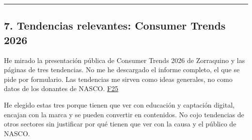 \documentclass[
]{article}
\begin{document}
\begin{center}\rule{0.5\linewidth}{0.5pt}\end{center}

\hypertarget{tendencias-relevantes-consumer-trends-2026}{%
\subsection{7. Tendencias relevantes: Consumer Trends
2026}\label{tendencias-relevantes-consumer-trends-2026}}

He mirado la presentación pública de Consumer Trends 2026 de Zorraquino
y las páginas de tres tendencias. No me he descargado el informe
completo, el que se pide por formulario. Las tendencias me sirven como
ideas generales, no como datos de los donantes de NASCO.
\href{https://trends.zorraquino.com/informes/consumer-trends/2026/}{F25}

He elegido estas tres porque tienen que ver con educación y captación
digital, encajan con la marca y se pueden convertir en contenidos. No
cojo tendencias de otros sectores sin justificar por qué tienen que ver
con la causa y el público de NASCO.
\end{document}
